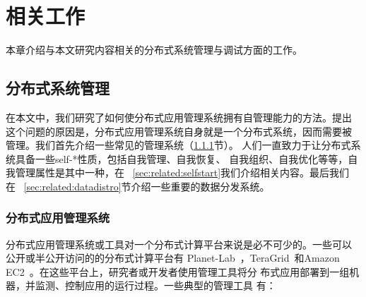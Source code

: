 \chapter{相关工作}
\label{chap:related}

本章介绍与本文研究内容相关的分布式系统管理与调试方面的工作。






\section{分布式系统管理}


% 
% 
% 
% 
% 
% 

在本文中，我们研究了如何使分布式应用管理系统拥有自管理能力的方法。提出
这个问题的原因是，分布式应用管理系统自身就是一个分布式系统，因而需要被
管理。我们首先介绍一些常见的管理系统（\ref{sec:related:mgmtsys}节）。
人们一直致力于让分布式系统具备一些self-*性质，包括自我管理、自我恢复、
自我组织、自我优化等等，自我管理属性是其中一种，在~
\ref{sec:related:selfstart}我们介绍相关内容。最后我们在~
\ref{sec:related:datadistro}节介绍一些重要的数据分发系统。

\subsection{分布式应用管理系统}
\label{sec:related:mgmtsys}

分布式应用管理系统或工具对一个分布式计算平台来说是必不可少的。一些可以
公开或半公开访问的的分布式计算平台有
Planet-Lab~\cite{Bavier2004}，TeraGrid~\cite{Catlett2002}和Amazon
EC2~\cite{Garfinkel2007}。在这些平台上，研究者或开发者使用管理工具将分
布式应用部署到一组机器，并监测、控制应用的运行过程。一些典型的管理工具
有：


